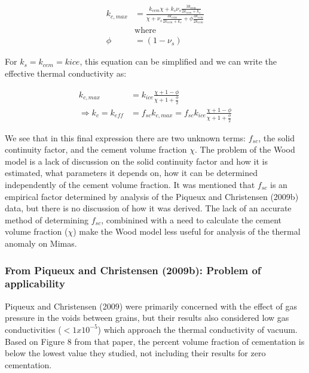 \documentclass[11pt]{article} %
\begin{document}
	\begin{equation}
	\begin{split}
	k_{c,max} &= \frac{k_{cem}\chi + k_{s}\nu_{s}\frac{3k_{cem}}{2k_{cem}+k_{s}}}{\chi +\nu_{s}\frac{3k_{cem}}{2k_{cem}+k_{s}}+\phi\frac{3k_{cem}}{2k_{cem}}} \\
	&\text{where} \\ 
	\phi &= (1-\nu_{s})
	\end{split}
	\end{equation}

	For $k_{s} = k_{cem} = k{ice}$, this equation can be simplified and we can write the effective thermal conductivity as:
	
	\begin{equation}
	\begin{split}
	k_{c,max} &= k_{ice} \frac{\chi + 1 - \phi}{\chi + 1 + \frac{\phi}{2}} \\
	\Rightarrow k_{c} = k_{eff} &= f_{sc} k_{c,max} = f_{sc} k_{ice} \frac{\chi + 1 - \phi}{\chi + 1 + \frac{\phi}{2}}
	\end{split}
	\end{equation}

	We see that in this final expression there are two unknown terms: $f_{sc}$, the solid continuity factor, and the cement volume fraction $\chi$. The problem of the Wood model is a lack of discussion on the solid continuity factor and how it is estimated, what parameters it depends on, how it can be determined independently of the cement volume fraction. It was mentioned that $f_{sc}$ is an empirical factor determined by analysis of the Piqueux and Christensen (2009b) data, but there is no discussion of how it was derived. The lack of an accurate method of determining $f_{sc}$, combinined with a need to calculate the cement volume fraction ($\chi$) make the Wood model less useful for analysis of the thermal anomaly on Mimas.
	
\subsubsection{From Piqueux and Christensen (2009b): Problem of applicability}

	 Piqueux and Christensen (2009) were primarily concerned with the effect of gas pressure in the voids between grains, but their results also considered low gas conductivities ($<1x10^{-5}$) which approach the thermal conductivity of vacuum. Based on Figure 8 from that paper, the percent volume fraction of cementation is below the lowest value they studied, not including their results for zero cementation. 
\end{document}
